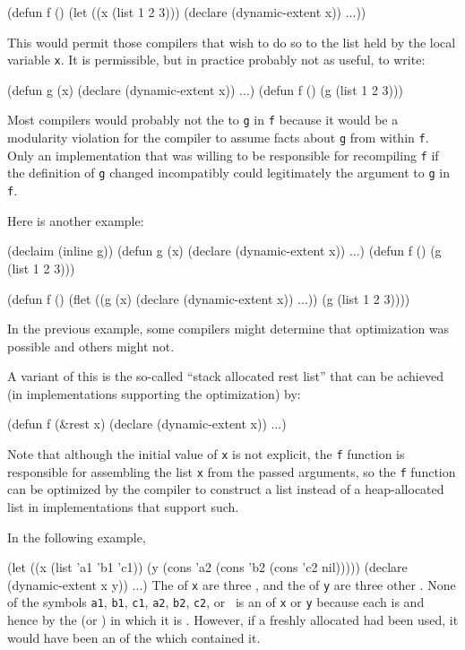 \code
 (defun f ()
   (let ((x (list 1 2 3)))
     (declare (dynamic-extent x))
         ...))
\endcode
 
This would permit those compilers that wish to do so to 
the list held by the local variable {\tt x}.  It is permissible,
but in practice probably not as useful, to write:
 
\code
 (defun g (x) (declare (dynamic-extent x)) ...)
 (defun f () (g (list 1 2 3)))
\endcode
 
Most compilers would probably not  the 
to {\tt g} in {\tt f} because it would be a modularity violation for the compiler
to assume facts about {\tt g} from within {\tt f}.   Only an implementation that 
was willing to be responsible for recompiling {\tt f} if the definition of {\tt g} 
changed incompatibly could legitimately  the  
argument to {\tt g} in {\tt f}.
 
Here is another example:

\code
 (declaim (inline g))
 (defun g (x) (declare (dynamic-extent x)) ...)
 (defun f () (g (list 1 2 3)))
 
 (defun f ()
   (flet ((g (x) (declare (dynamic-extent x)) ...))
     (g (list 1 2 3))))
 
\endcode
In the previous example, some compilers might determine that optimization was 
possible and others might not.
 
A variant of this is the so-called ``stack allocated rest list''
that can be achieved (in implementations supporting the optimization) by:
 
\code
 (defun f (&rest x)
   (declare (dynamic-extent x))
   ...)
\endcode
 
Note that although the initial value of {\tt x} is not explicit, the {\tt f}
function is responsible for assembling the list {\tt x} from the passed arguments,
so the {\tt f} function can be optimized by the compiler to construct a 
 list instead of a heap-allocated list in implementations
that support such.
 
In the following example,

\code
 (let ((x (list 'a1 'b1 'c1))
       (y (cons 'a2 (cons 'b2 (cons 'c2 nil)))))
   (declare (dynamic-extent x y))
   ...)
\endcode
The  of {\tt x} are three 
,  and the 
of {\tt y} are three other .  
None of the symbols {\tt a1},  {\tt b1},  {\tt c1},  {\tt a2},
{\tt b2},  {\tt c2},  or \nil\ is an
 of {\tt x} or {\tt y} because each
is  and hence  by the 
(or ) in which it is .
However, if a freshly allocated   had
been used, it would have been an  of
the  which contained it.

